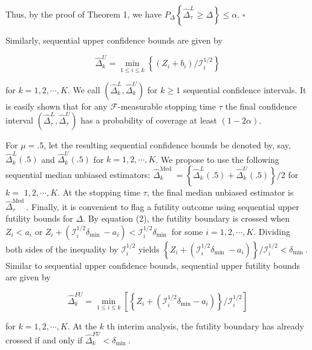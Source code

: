 \documentclass[10pt]{article}
\begin{document}
Thus, by the proof of Theorem 1, we have $P_{\Delta}\left\{\hat{\Delta}_{\tau}^{L} \geq \Delta\right\} \leq \alpha$. \(\square\)

Similarly, sequential upper confidence bounds are given by


\begin{equation*}
\hat{\Delta}_{k}^{U}=\min _{1 \leq i \leq k}\left\{\left(Z_{i}+b_{i}\right) / \mathcal{I}_{i}^{1 / 2}\right\} \tag{9}
\end{equation*}


for $k=1,2, \cdots, K$. We call $\left(\hat{\Delta}_{k}^{L}, \hat{\Delta}_{k}^{U}\right)$ for $k \geq 1$ sequential confidence intervals. It is easily shown that for any $\mathcal{F}$-measurable stopping time $\tau$ the final confidence interval $\left(\hat{\Delta}_{\tau}^{L}, \hat{\Delta}_{\tau}^{U}\right)$ has a probability of coverage at least $(1-2 \alpha)$.

For $\mu=.5$, let the resulting sequential confidence bounds be denoted by, say, $\hat{\Delta}_{k}^{L}(.5)$ and $\hat{\Delta}_{k}^{U}(.5)$ for $k=1,2, \cdots, K$. We propose to use the following sequential median unbiased estimators: $\hat{\Delta}_{k}^{\text {Med }}=\left\{\hat{\Delta}_{k}^{L}(.5)+\hat{\Delta}_{k}^{U}(.5)\right\} / 2$ for $k=$ $1,2, \cdots, K$. At the stopping time $\tau$, the final median unbiased estimator is $\hat{\Delta}_{\tau}^{\text {Med }}$. Finally, it is convenient to flag a futility outcome using sequential upper futility bounds for $\Delta$. By equation (2), the futility boundary is crossed when $Z_{i}<a_{i}$ or $Z_{i}+\left(\mathcal{I}_{i}^{1 / 2} \delta_{\text {min }}-a_{i}\right)<\mathcal{I}_{i}^{1 / 2} \delta_{\text {min }}$ for some $i=1,2, \cdots, K$. Dividing both sides of the inequality by $\mathcal{I}_{i}^{1 / 2}$ yields $\left\{Z_{i}+\left(\mathcal{I}_{i}^{1 / 2} \delta_{\text {min }}-a_{i}\right)\right\} / \mathcal{I}_{i}^{1 / 2}<\delta_{\text {min }}$. Similar to sequential upper confidence bounds, sequential upper futility bounds are given by


\begin{equation*}
\hat{\Delta}_{k}^{F U}=\min _{1 \leq i \leq k}\left[\left\{Z_{i}+\left(\mathcal{I}_{i}^{1 / 2} \delta_{\min }-a_{i}\right)\right\} / \mathcal{I}_{i}^{1 / 2}\right] \tag{10}
\end{equation*}


for $k=1,2, \cdots, K$. At the $k$ th interim analysis, the futility boundary has already crossed if and only if $\hat{\Delta}_{k}^{F U}<\delta_{\text {min }}$.
\end{document}
